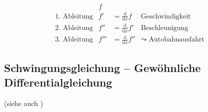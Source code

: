 \begin{equation*}
\begin{array}{llll}
	& f \\
	\text{1. Ableitung} & f' &= \frac{\mathrm d}{\mathrm dx}f & \text{Geschwindigkeit} \\
	\text{2. Ableitung} & f'' &= \frac{\mathrm d}{\mathrm dx}f' & \text{Beschleunigung} \\
	\text{3. Ableitung} & f''' &= \frac{\mathrm d}{\mathrm dx}f'' & \leadsto \text{ Autobahnausfahrt}
\end{array}
\end{equation*}

\subsection{Schwingungsgleichung -- Gewöhnliche Differentialgleichung}
(siehe auch \cite[Kap. 8]{bornemann})

	
